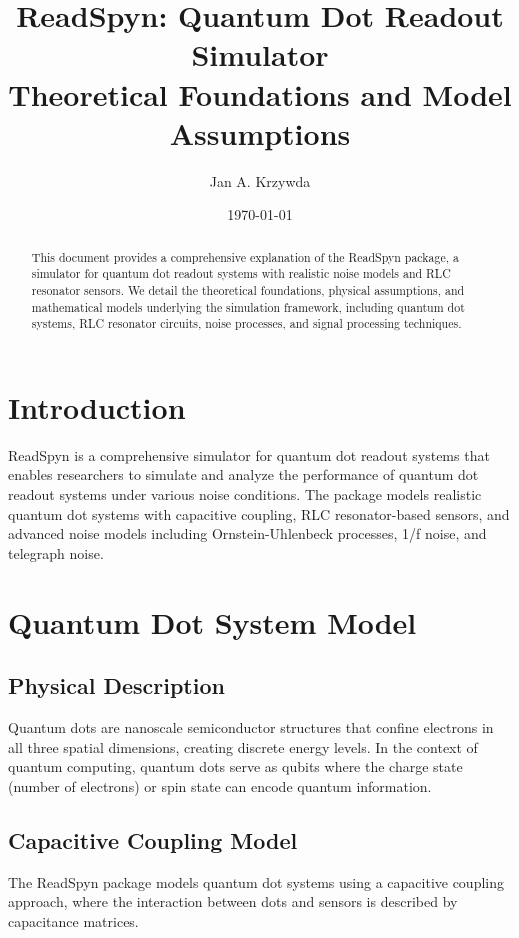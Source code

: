 \documentclass[11pt,a4paper]{article}
\title{ReadSpyn: Quantum Dot Readout Simulator\\
\large Theoretical Foundations and Model Assumptions}
\author{Jan A. Krzywda}
\date{\today}
\begin{document}
\maketitle

\begin{abstract}
This document provides a comprehensive explanation of the ReadSpyn package, a simulator for quantum dot readout systems with realistic noise models and RLC resonator sensors. We detail the theoretical foundations, physical assumptions, and mathematical models underlying the simulation framework, including quantum dot systems, RLC resonator circuits, noise processes, and signal processing techniques.
\end{abstract}

\tableofcontents
\newpage

\section{Introduction}

ReadSpyn is a comprehensive simulator for quantum dot readout systems that enables researchers to simulate and analyze the performance of quantum dot readout systems under various noise conditions. The package models realistic quantum dot systems with capacitive coupling, RLC resonator-based sensors, and advanced noise models including Ornstein-Uhlenbeck processes, 1/f noise, and telegraph noise.

\section{Quantum Dot System Model}

\subsection{Physical Description}

Quantum dots are nanoscale semiconductor structures that confine electrons in all three spatial dimensions, creating discrete energy levels. In the context of quantum computing, quantum dots serve as qubits where the charge state (number of electrons) or spin state can encode quantum information.

\subsection{Capacitive Coupling Model}

The ReadSpyn package models quantum dot systems using a capacitive coupling approach, where the interaction between dots and sensors is described by capacitance matrices.
\end{document}
